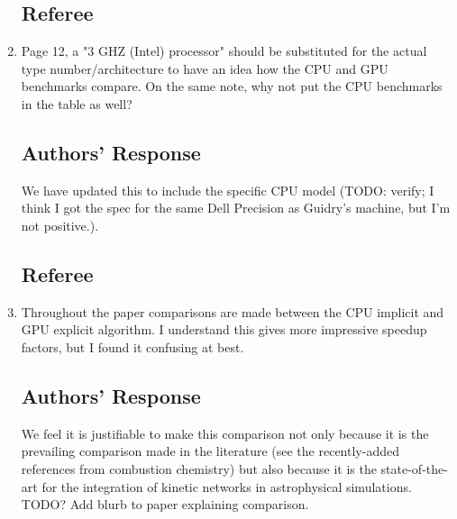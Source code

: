 \documentclass[12pt]{article}
\begin{document}
\begin{enumerate}
\subsection*{Referee}
\item Page 12, a "3 GHZ (Intel) processor" should be substituted for the actual type number/architecture to have an idea how the CPU and GPU benchmarks compare. On the same note, why not put the CPU benchmarks in the table as well?

\subsection*{Authors' Response}
We have updated this to include the specific CPU model (TODO: verify; I think I got the spec for the same Dell Precision as Guidry's machine, but I'm not positive.).

\subsection*{Referee}
\item Throughout the paper comparisons are made between the CPU implicit and GPU explicit algorithm. I understand this gives more impressive speedup factors, but I found it confusing at best. 

\subsection*{Authors' Response}
We feel it is justifiable to make this comparison not only because it is the prevailing comparison made in the literature (see the recently-added references from combustion chemistry) but also because it is the state-of-the-art for the integration of kinetic networks in astrophysical simulations.  TODO? Add blurb to paper explaining comparison.

\end{enumerate}
\end{document}
